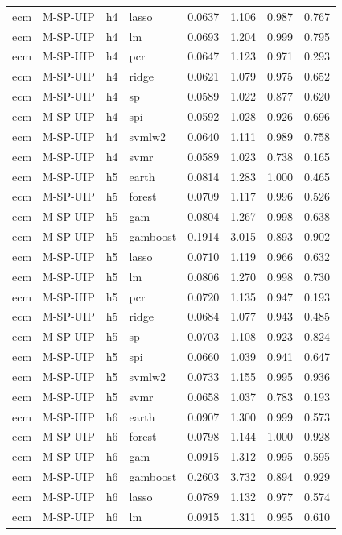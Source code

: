 \begin{ThreePartTable}
\begin{longtable}[t]{llclcccc}
ecm & M-SP-UIP & h4 & lasso & 0.0637 & 1.106 & 0.987 & 0.767\\
ecm & M-SP-UIP & h4 & lm & 0.0693 & 1.204 & 0.999 & 0.795\\
ecm & M-SP-UIP & h4 & pcr & 0.0647 & 1.123 & 0.971 & 0.293\\
ecm & M-SP-UIP & h4 & ridge & 0.0621 & 1.079 & 0.975 & 0.652\\
ecm & M-SP-UIP & h4 & sp & 0.0589 & 1.022 & 0.877 & 0.620\\
ecm & M-SP-UIP & h4 & spi & 0.0592 & 1.028 & 0.926 & 0.696\\
ecm & M-SP-UIP & h4 & svmlw2 & 0.0640 & 1.111 & 0.989 & 0.758\\
ecm & M-SP-UIP & h4 & svmr & 0.0589 & 1.023 & 0.738 & 0.165\\
\addlinespace
ecm & M-SP-UIP & h5 & earth & 0.0814 & 1.283 & 1.000 & 0.465\\
ecm & M-SP-UIP & h5 & forest & 0.0709 & 1.117 & 0.996 & 0.526\\
ecm & M-SP-UIP & h5 & gam & 0.0804 & 1.267 & 0.998 & 0.638\\
ecm & M-SP-UIP & h5 & gamboost & 0.1914 & 3.015 & 0.893 & 0.902\\
ecm & M-SP-UIP & h5 & lasso & 0.0710 & 1.119 & 0.966 & 0.632\\
ecm & M-SP-UIP & h5 & lm & 0.0806 & 1.270 & 0.998 & 0.730\\
ecm & M-SP-UIP & h5 & pcr & 0.0720 & 1.135 & 0.947 & 0.193\\
ecm & M-SP-UIP & h5 & ridge & 0.0684 & 1.077 & 0.943 & 0.485\\
ecm & M-SP-UIP & h5 & sp & 0.0703 & 1.108 & 0.923 & 0.824\\
ecm & M-SP-UIP & h5 & spi & 0.0660 & 1.039 & 0.941 & 0.647\\
ecm & M-SP-UIP & h5 & svmlw2 & 0.0733 & 1.155 & 0.995 & 0.936\\
ecm & M-SP-UIP & h5 & svmr & 0.0658 & 1.037 & 0.783 & 0.193\\
\addlinespace
ecm & M-SP-UIP & h6 & earth & 0.0907 & 1.300 & 0.999 & 0.573\\
ecm & M-SP-UIP & h6 & forest & 0.0798 & 1.144 & 1.000 & 0.928\\
ecm & M-SP-UIP & h6 & gam & 0.0915 & 1.312 & 0.995 & 0.595\\
ecm & M-SP-UIP & h6 & gamboost & 0.2603 & 3.732 & 0.894 & 0.929\\
ecm & M-SP-UIP & h6 & lasso & 0.0789 & 1.132 & 0.977 & 0.574\\
ecm & M-SP-UIP & h6 & lm & 0.0915 & 1.311 & 0.995 & 0.610\\

\end{longtable}
\end{ThreePartTable}
